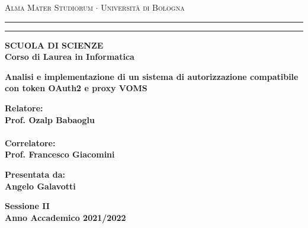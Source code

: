 \documentclass[12pt,a4paper,openright,twoside]{report}
\begin{document}
\begin{titlepage}
	\begin{center}
		{{\Large{\textsc{Alma Mater Studiorum $\cdot$ Università di
							Bologna}}}} \rule[0.1cm]{15.8cm}{0.1mm}
		\rule[0.5cm]{15.8cm}{0.6mm}
		{\small{\bf SCUOLA DI SCIENZE\\
				Corso di Laurea in Informatica }}
	\end{center}
	\vspace{15mm}
	\begin{center}
		{\LARGE{\bf Analisi e implementazione di un sistema di autorizzazione compatibile con token OAuth2 e proxy VOMS}}\\
		\vspace{3mm}
	\end{center}
	\vspace{40mm}
	\par
	\noindent
	\begin{minipage}[t]{0.47\textwidth}
		{\large{\bf Relatore:\\
				Prof. Ozalp Babaoglu\\\\
				Correlatore:\\
				Prof. Francesco Giacomini}}
	\end{minipage}
	\hfill
	\begin{minipage}[t]{0.47\textwidth}\raggedleft
		{\large{\bf Presentata da:\\
				Angelo Galavotti}}
	\end{minipage}
	\vspace{20mm}
	\begin{center}
		{\large{\bf Sessione II\\
				Anno Accademico 2021/2022}}
	\end{center}
\end{titlepage}
\end{document}

